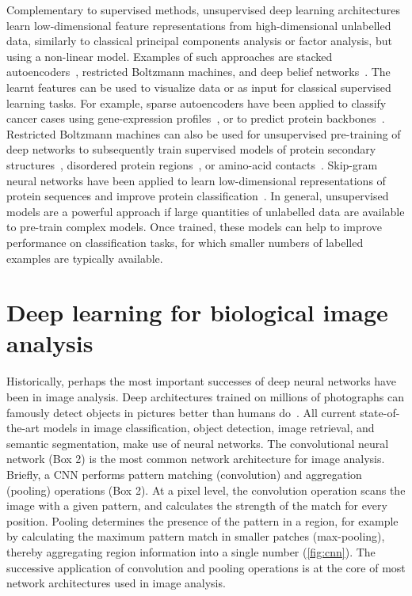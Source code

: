 Complementary to supervised methods, unsupervised deep learning architectures learn low-dimensional feature representations from high-dimensional unlabelled data, similarly to classical principal components analysis or factor analysis, but using a non-linear model. Examples of such approaches are stacked autoencoders~\citep{vincent_stacked_2010}, restricted Boltzmann machines, and deep belief networks~\citep{hinton_reducing_2006}. The learnt features can be used to visualize data or as input for classical supervised learning tasks. For example, sparse autoencoders have been applied to classify cancer cases using gene-expression profiles~\citep{fakoor_using_2013}, or to predict protein backbones~\citep{lyons_predicting_2014-1}. Restricted Boltzmann machines can also be used for unsupervised pre-training of deep networks to subsequently train supervised models of protein secondary structures~\citep{spencer_deep_2015}, disordered protein regions~\citep{eickholt_predicting_2012,eickholt_dndisorder:_2013}, or amino-acid contacts~\citep{eickholt_predicting_2012}. Skip-gram neural networks have been applied to learn low-dimensional representations of protein sequences and improve protein classification~\citep{asgari_protvec:_2015}. In general, unsupervised models are a powerful approach if large quantities of unlabelled data are available to pre-train complex models. Once trained, these models can help to improve performance on classification tasks, for which smaller numbers of labelled examples are typically available.




\section{Deep learning for biological image analysis}

Historically, perhaps the most important successes of deep neural networks have been in image analysis. Deep architectures trained on millions of photographs can famously detect objects in pictures better than humans do~\citep{he_deep_2015}. All current state-of-the-art models in image classification, object detection, image retrieval, and semantic segmentation, make use of neural networks. The convolutional neural network (Box 2) is the most common network architecture for image analysis. Briefly, a CNN performs pattern matching (convolution) and aggregation (pooling) operations (Box 2). At a pixel level, the convolution operation scans the image with a given pattern, and calculates the strength of the match for every position. Pooling determines the presence of the pattern in a region, for example by calculating the maximum pattern match in smaller patches (max-pooling), thereby aggregating region information into a single number (\autoref{fig:cnn}). The successive application of convolution and pooling operations is at the core of most network architectures used in image analysis.

